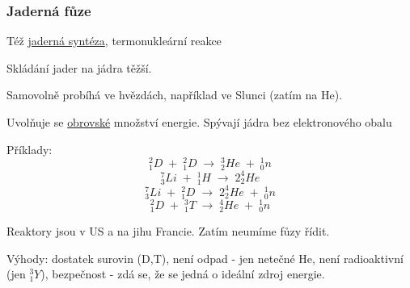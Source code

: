 \subsubsection{Jaderná fůze}
Též \underline{jaderná syntéza}, termonukleární reakce

Skládání jader na jádra těžší.

Samovolně probíhá ve hvězdách, například ve Slunci (zatím na He).

Uvolňuje se \underline{obrovské} množství energie. Spývají jádra bez elektronového obalu

\vspace{1em}
Příklady:
\[^2_1D \; + \; ^2_1D \; \longrightarrow \; ^3_2He \; + \; ^1_0n\]
\[^7_3Li \; + \; ^1_1H \; \longrightarrow \; 2^4_2He\]
\[^7_3Li \; + \; ^2_1D \; \longrightarrow \; 2^4_2He \; + \; ^1_0n\]
\[^2_1D \; + \; ^3_1T \; \longrightarrow \; ^4_2He \; + \; ^1_0n\]

\vspace{1em}
Reaktory jsou v US a na jihu Francie. Zatím neumíme fůzy řídit.

\vspace{1em}

Výhody: dostatek surovin (D,T), není odpad - jen netečné He, není radioaktivní (jen $^3_1Y$), bezpečnost - zdá se, že se jedná o ideální zdroj energie.